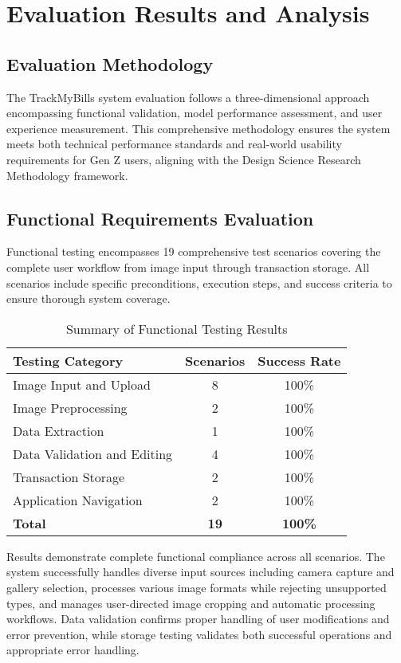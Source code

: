 \section{Evaluation Results and Analysis}

\subsection{Evaluation Methodology}
The TrackMyBills system evaluation follows a three-dimensional approach encompassing functional validation, model performance assessment, and user experience measurement. This comprehensive methodology ensures the system meets both technical performance standards and real-world usability requirements for Gen Z users, aligning with the Design Science Research Methodology framework.

\subsection{Functional Requirements Evaluation}
Functional testing encompasses 19 comprehensive test scenarios covering the complete user workflow from image input through transaction storage. All scenarios include specific preconditions, execution steps, and success criteria to ensure thorough system coverage.

\begin{table}[htbp]
\centering
\caption{Summary of Functional Testing Results}
\label{tab:functional-summary}
\begin{tabular}{|l|c|c|}
\hline
\textbf{Testing Category} & \textbf{Scenarios} & \textbf{Success Rate} \\
\hline
Image Input and Upload & 8 & 100\% \\
Image Preprocessing & 2 & 100\% \\
Data Extraction & 1 & 100\% \\
Data Validation and Editing & 4 & 100\% \\
Transaction Storage & 2 & 100\% \\
Application Navigation & 2 & 100\% \\
\hline
\textbf{Total} & \textbf{19} & \textbf{100\%} \\
\hline
\end{tabular}
\end{table}

Results demonstrate complete functional compliance across all scenarios. The system successfully handles diverse input sources including camera capture and gallery selection, processes various image formats while rejecting unsupported types, and manages user-directed image cropping and automatic processing workflows. Data validation confirms proper handling of user modifications and error prevention, while storage testing validates both successful operations and appropriate error handling.


